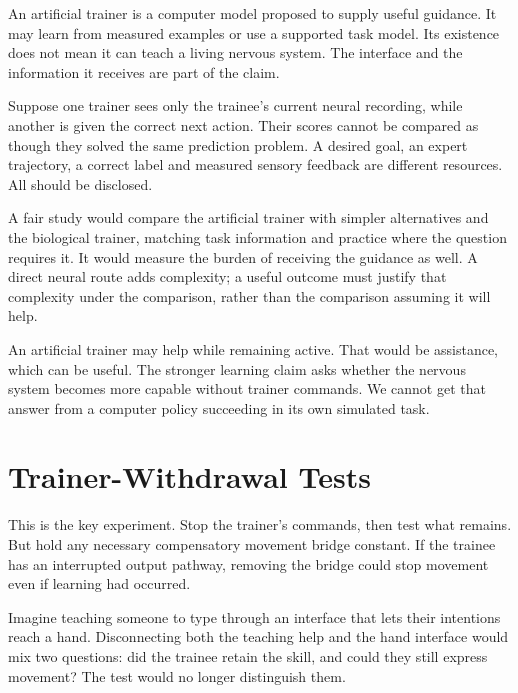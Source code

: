 An artificial trainer is a computer model proposed to supply useful guidance. It may learn from measured examples or use a supported task model. Its existence does not mean it can teach a living nervous system. The interface and the information it receives are part of the claim.\par

Suppose one trainer sees only the trainee's current neural recording, while another is given the correct next action. Their scores cannot be compared as though they solved the same prediction problem. A desired goal, an expert trajectory, a correct label and measured sensory feedback are different resources. All should be disclosed.\par

A fair study would compare the artificial trainer with simpler alternatives and the biological trainer, matching task information and practice where the question requires it. It would measure the burden of receiving the guidance as well. A direct neural route adds complexity; a useful outcome must justify that complexity under the comparison, rather than the comparison assuming it will help.\par

An artificial trainer may help while remaining active. That would be assistance, which can be useful. The stronger learning claim asks whether the nervous system becomes more capable without trainer commands. We cannot get that answer from a computer policy succeeding in its own simulated task.\par

\section{Trainer-Withdrawal Tests}

This is the key experiment. Stop the trainer's commands, then test what remains. But hold any necessary compensatory movement bridge constant. If the trainee has an interrupted output pathway, removing the bridge could stop movement even if learning had occurred.\par

Imagine teaching someone to type through an interface that lets their intentions reach a hand. Disconnecting both the teaching help and the hand interface would mix two questions: did the trainee retain the skill, and could they still express movement? The test would no longer distinguish them.\par

